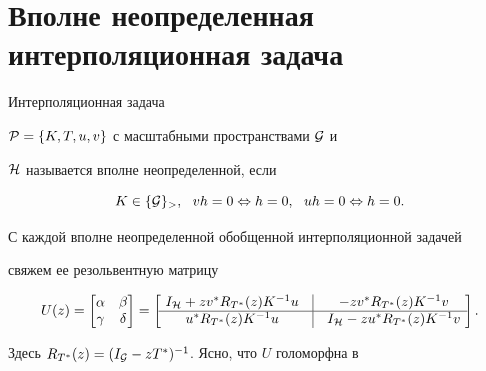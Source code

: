 \section{Вполне неопределенная интерполяционная задача}





\begin{defn}


Интерполяционная задача


$ {\cal P} = \{ K,T,u,v \}$ с масштабными пространствами $\cal G $ и


$\cal H $ называется вполне неопределенной, если 


\begin{equation}


K\in \{{\cal G}\}_>,\ \


vh=0 \Leftrightarrow h=0,\ \ uh=0 \Leftrightarrow h=0.


\end{equation}


\end{defn}





С каждой вполне неопределенной обобщенной интерполяционной задачей


свяжем ее резольвентную матрицу


\begin{equation}


U(z)=


\begin{bmatrix}


\alpha & \beta \\


\gamma & \delta


\end{bmatrix}=


\left[\ \begin{matrix}


I_{\cal H}+zv^*R_{T^*}(z)K^{-1}u & \vline & -zv^*R_{T^*}(z)K^{-1}v \\


\hline


u^*R_{T^*}(z)K^{-1}u & \vline & I_{\cal H}-zu^*R_{T^*}(z)K^{-1}v


\end{matrix}


\ \right].


\end{equation}


Здесь $R_{T^*}(z)=(I_{{\cal G}}-zT^*)^{-1}$. Ясно, что $U$ голоморфна в


